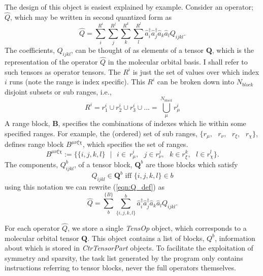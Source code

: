 \noindent The design of this object is easiest explained by example. Consider an operator; $\hat{Q}$,
which may be written in second quantized form as
\begin{equation}
\hat{Q} =  \sum_{i}^{R^{i}}\sum_{j}^{R^{j}}\sum_{k}^{R^{k}}\sum_{l}^{R^{l}} \hat{a}^{\dagger}_{i} \hat{a}^{\dagger}_{j} \hat{a}_{k} \hat{a}_{l} Q_{ijkl}.
\label{eqn:Q_def}
\end{equation}
\noindent  The coefficients,
$Q_{ijkl}$, can be thought of as elements of a tensor $\mathbf{Q}$, which is
the representation of the operator $\hat{Q}$ in the molecular orbital basis.
I shall refer to such tensors as operator tensors. The $R^{i}$ is just the set
of values over which index $i$ runs (note the range is index specific). This
$R^{i}$ can be broken down into $N_{block}$ disjoint subsets or sub ranges, i.e.,
\begin{equation}
R^{i} = r_{1}^{i} \cup r_{2}^{i} \cup r_{3}^{i} \cup ... = \bigcup^{N_{block}}_{\mu} r_{\mu}^{i}
\end{equation}
\noindent A range block, $\mathbf{B}$, specifies the combinations of indexes which lie within some specified ranges. For example, the (ordered) set
of sub ranges, $\{ r_{\mu},\text{\ } r_{\nu}, \text{\ }r_{\xi}, \text{\ } r_{\chi} \}$, defines range block $B^{\mu\nu\xi\chi}$, which specifies the set
of ranges.
\begin{equation}
B^{\mu\nu\xi\chi} :=  \{ \{i,j,k,l\}  \text{\ }|  \text{\ }i \in \ r_{\mu}^{i} , \text{\ } j \in r_{\nu}^{j},  \text{\ } k \in r_{\xi}^{k},  \text{\ }l\in r^{l}_{\chi} \}.
\end{equation}
The components, $ Q_{ijkl}^{b}$, of a tensor block, $\mathbf{Q}^{b}$ are those blocks which satisfy
\begin{equation}
Q_{ijkl} \in \mathbf{Q}^{b} \text{ \ \ iff \ \ }  \{ i, j, k, l \} \in b   
\end{equation}
using this notation we can rewrite (\ref{eqn:Q_def}) as 
\begin{equation}
\hat{Q} =  \sum_{b}^{\{B\}} \sum_{\{i,j,k,l\}}^{b }
\hat{a}^{\dagger}_{i} \hat{a}^{\dagger}_{j} \hat{a}_{k} \hat{a}_{l} Q_{ijkl}.
\label{eqn:Q_block_def}
\end{equation}
\noindent 

\noindent For each operator $\hat{Q}$, we store a single \emph{TensOp} object,
which corresponds to a molecular orbital tensor $\mathbf{Q}$. This object
contains a list of blocks, $Q^{b}$, information about which is stored in
\emph{CtrTensorPart} objects. To facilitate the exploitation of symmetry and
sparsity, the task list generated by the program only contains instructions
referring to tensor blocks, never the full operators themselves.


